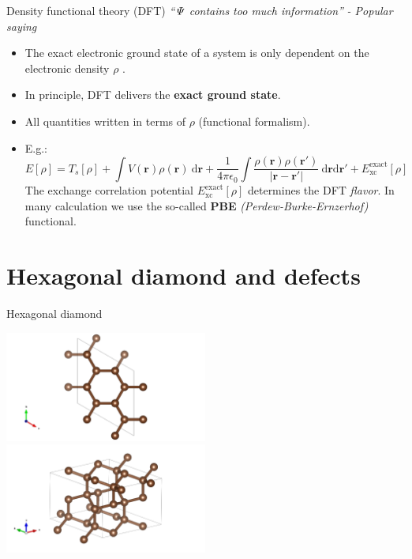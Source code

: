 \documentclass[]{beamer}
\begin{document}
\begin{frame}{Density functional theory (DFT)}
  \textit{``$ \it \Psi  $  contains too much information''}
  \hfill \textit{- Popular saying}
  \begin{itemize}
    \item The exact electronic ground state of a system is only dependent on
      the electronic density $ \rho $ .
    \item In principle, DFT delivers the \textbf{exact ground state}.
    \item All quantities written in terms of $ \rho $ (functional formalism).
    \item E.g.:
      \[
        E[ \rho ] =
        T_{s} [ \rho  ]
        +
        \int  V ( \mathbf{r} ) \rho ( \mathbf{r} ) \ \mathrm{d} \mathbf{r}
        +
        \frac{1}{4\pi \epsilon _{0}}
        \int
        \frac{\rho ( \mathbf{r} ) \rho ( \mathbf{r}' )}{| \mathbf{r} - \mathbf{r}'|}
        \ \mathrm{d} \mathbf{r}\mathrm{d} \mathbf{r}'
        +
        E^{ \mathrm{exact}}_{ \mathrm{xc}} [ \rho ]
      \]
      The exchange correlation potential
      $ E^{ \mathrm{exact}}_{ \mathrm{xc}} [ \rho ] $
      determines the DFT \textit{flavor}.
      In many calculation we use the so-called \textbf{PBE} \textit{(Perdew-Burke-Ernzerhof)} functional.
  \end{itemize}
\end{frame}




\section{Hexagonal diamond and defects} %


\begin{frame}{Hexagonal diamond}
  \begin{center}
    \includegraphics[width=0.5\textwidth, trim=0 0 30em 0,clip]{images/poscar_hex_16_hex-view.png}\\
    \includegraphics[width=0.5\textwidth, trim=0 0 27em 0,clip]{images/poscar_hex_16_birdseye.png}
  \end{center}
\end{frame}
\end{document}
